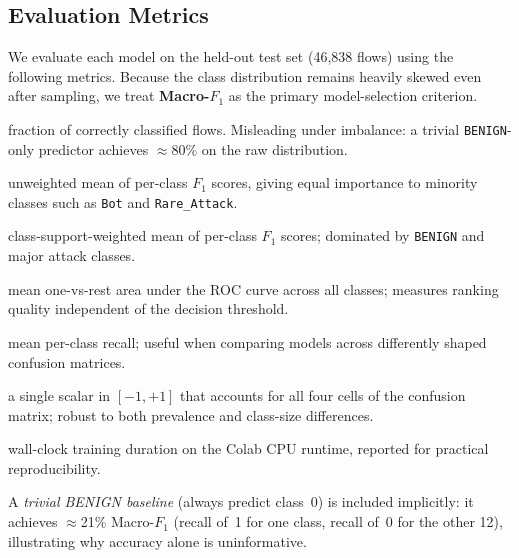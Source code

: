 \subsection{Evaluation Metrics}
\label{sec:exp-metrics}

We evaluate each model on the held-out test set (46,838 flows) using the following metrics. Because the class distribution remains heavily skewed even after sampling, we treat \textbf{Macro-$F_1$} as the primary model-selection criterion.

\begin{description}[leftmargin=1.2em,itemsep=2pt,topsep=2pt]
    \item[Accuracy] fraction of correctly classified flows. Misleading under imbalance: a trivial \texttt{BENIGN}-only predictor achieves ${\approx}80\%$ on the raw distribution.
    \item[Macro-$F_1$] unweighted mean of per-class $F_1$ scores, giving equal importance to minority classes such as \texttt{Bot} and \texttt{Rare\_Attack}.
    \item[Weighted-$F_1$] class-support-weighted mean of per-class $F_1$ scores; dominated by \texttt{BENIGN} and major attack classes.
    \item[ROC-AUC (macro OvR)] mean one-vs-rest area under the ROC curve across all classes; measures ranking quality independent of the decision threshold.
    \item[Balanced Accuracy] mean per-class recall; useful when comparing models across differently shaped confusion matrices.
    \item[Matthews Correlation Coefficient (MCC)] a single scalar in $[-1, +1]$ that accounts for all four cells of the confusion matrix; robust to both prevalence and class-size differences.
    \item[Training time] wall-clock training duration on the Colab CPU runtime, reported for practical reproducibility.
\end{description}

\noindent A \emph{trivial BENIGN baseline} (always predict class~0) is included implicitly: it achieves $\approx$21\% Macro-$F_1$ (recall of~1 for one class, recall of~0 for the other 12), illustrating why accuracy alone is uninformative.
